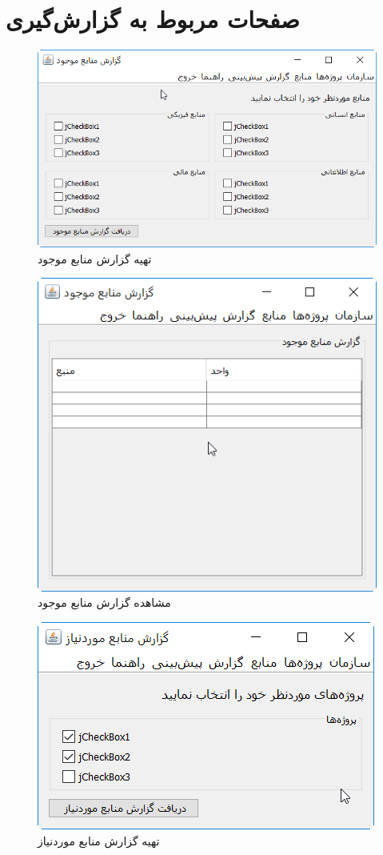 \section{صفحات مربوط به گزارش‌گیری}
\begin{figure}[H]
	\centering
	\includegraphics[scale=0.8]{img/prot/AvailableResourcesReport}
	\caption{تهیه گزارش منابع موجود}
\end{figure}
\begin{figure}[H]
	\centering
	\includegraphics[scale=0.8]{img/prot/ViewAvailableResourcesReport}
	\caption{مشاهده گزارش منابع موجود}
\end{figure}
\begin{figure}[H]
	\centering
	\includegraphics[scale=0.8]{img/prot/NeededResourceReport}
	\caption{تهیه گزارش منابع موردنیاز}
\end{figure}
